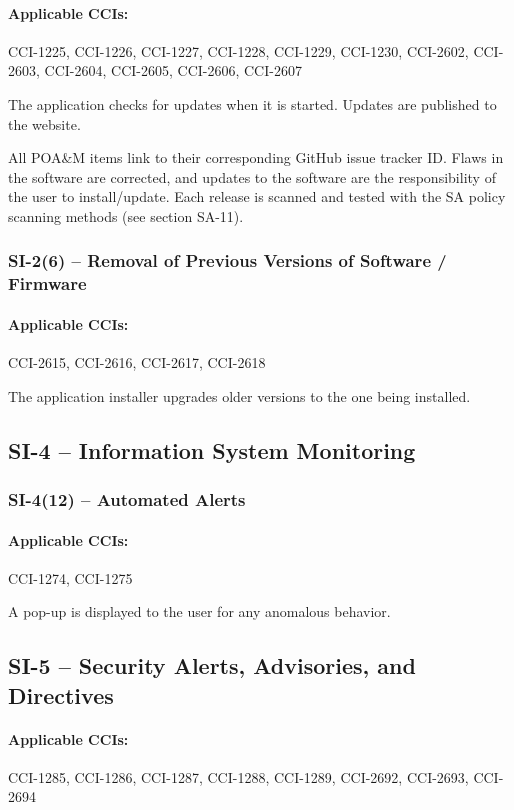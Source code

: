 \documentclass[letterpaper, 10pt, twoside]{article}
\begin{document}
\paragraph{Applicable CCIs:} CCI-1225, CCI-1226, CCI-1227, CCI-1228, CCI-1229, CCI-1230, CCI-2602, CCI-2603, CCI-2604, CCI-2605, CCI-2606, CCI-2607

The application checks for updates when it is started. Updates are published to the website.

All POA\&M items link to their corresponding GitHub issue tracker ID. Flaws in the software are corrected, and updates to the software are the responsibility of the user to install/update. Each release is scanned and tested with the SA policy scanning methods (see section SA-11).

\subsubsection{SI-2(6) -- Removal of Previous Versions of Software / Firmware}

\paragraph{Applicable CCIs:} CCI-2615, CCI-2616, CCI-2617, CCI-2618

The application installer upgrades older versions to the one being installed.

\subsection{SI-4 -- Information System Monitoring}

\subsubsection{SI-4(12) -- Automated Alerts}

\paragraph{Applicable CCIs:} CCI-1274, CCI-1275

A pop-up is displayed to the user for any anomalous behavior.

\subsection{SI-5 -- Security Alerts, Advisories, and Directives}

\paragraph{Applicable CCIs:} CCI-1285, CCI-1286, CCI-1287, CCI-1288, CCI-1289, CCI-2692, CCI-2693, CCI-2694
\end{document}
